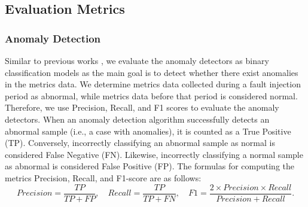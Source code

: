 \begin{table}
\centering
\caption{Characteristics of collected data from three benchmark microservice systems (\#metrics, \#svc, \#t\_svc: number of metrics, services, and targeted services in the system. \#fault: number of fault types).} \label{tab:real-data}
\vspace{-0.2cm}

\end{table}



\subsection{Evaluation Metrics}


\subsubsection{Anomaly Detection}
Similar to previous works \cite{Chen2014Causeinfer, chen2016causeinfer, chen2022adaptive}, we evaluate the anomaly detectors as binary classification models as the main goal is to detect whether there exist anomalies in the metrics data. We determine metrics data collected during a fault injection period as abnormal, while metrics data before that period is considered normal. Therefore, we use Precision, Recall, and F1 scores to evaluate the anomaly detectors. When an anomaly detection algorithm successfully detects an abnormal sample (i.e., a case with anomalies), it is counted as a True Positive (TP). Conversely, incorrectly classifying an abnormal sample as normal is considered False Negative (FN). Likewise, incorrectly classifying a normal sample as abnormal is considered False Positive (FP). The formulas for computing the metrics Precision, Recall, and F1-score are as follows:
\begin{equation}
    Precision = \frac{TP}{TP + FP}, \quad Recall = \frac{TP}{TP + FN}, \quad F1 = \frac{2\times Precision \times Recall}{Precision + Recall}.
\end{equation}


